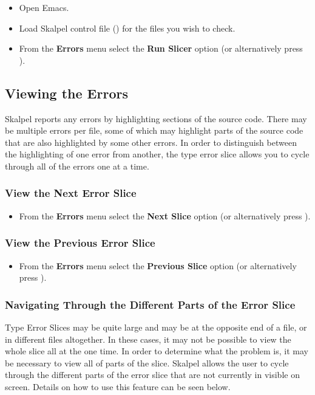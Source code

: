 \documentclass{article}
\begin{document}
\begin{itemize}
\item Open Emacs.
\item Load Skalpel control file () for
  the files you wish to check.

\item From the \textbf{Errors} menu select the \textbf{Run Slicer}
  option (or alternatively press ).
\end{itemize}


\subsection{Viewing the Errors}

Skalpel reports any errors by highlighting sections of
the source code. There may be multiple errors per file, some of which
may highlight parts of the source code that are also highlighted by
some other errors. In order to distinguish between the highlighting
of one error from another, the type error slice allows you to cycle
through all of the errors one at a time.

\subsubsection{View the Next Error Slice}

\begin{itemize}
\item From the \textbf{Errors} menu select the \textbf{Next Slice}
  option (or alternatively press ).
\end{itemize}

\subsubsection{View the Previous Error Slice}

\begin{itemize}
\item From the \textbf{Errors} menu select the \textbf{Previous Slice}
  option (or alternatively press ).
\end{itemize}

\subsubsection{Navigating Through the Different Parts of the Error Slice}
Type Error Slices may be quite large and may be at the opposite end of
a file, or in different files altogether. In these cases, it may not
be possible to view the whole slice all at the one time. In order to
determine what the problem is, it may be necessary to view all of
parts of the slice. Skalpel allows the user to cycle
through the different parts of the error slice that are not currently
in visible on screen. Details on how to use this feature can be seen below.
\end{document}
